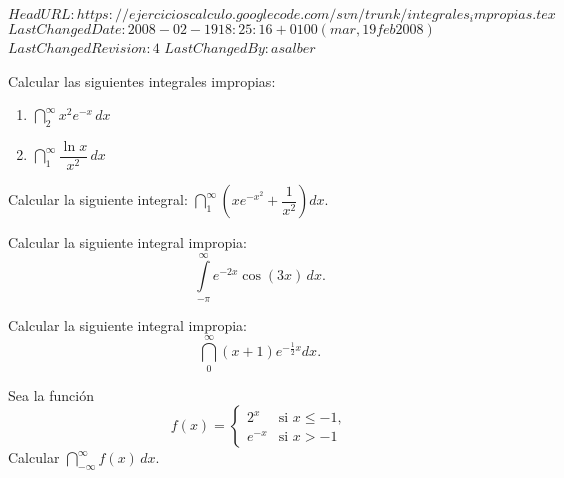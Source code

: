 \svnidlong
{$HeadURL: https://ejercicioscalculo.googlecode.com/svn/trunk/integrales_impropias.tex $}
{$LastChangedDate: 2008-02-19 18:25:16 +0100 (mar, 19 feb 2008) $}
{$LastChangedRevision: 4 $}
{$LastChangedBy: asalber $}
%
{Calcular las siguientes integrales impropias:
\begin{multicols}{2}
\begin{enumerate}
\item $\dint\limits_{2}^{\infty }x^{2}e^{-x}\,dx$
\item $\dint\limits_{1}^{\infty }\dfrac{\ln x}{x^{2}}\,dx$
\end{enumerate}
\end{multicols}
}


{Calcular la siguiente integral: $\dint\limits_{1}^{\infty }\left(xe^{-x^{2}}+\dfrac{1}{x^{2}}\right) dx.$
}


{Calcular la siguiente integral impropia:
\[
\int\limits_{ - \pi }^\infty  {e^{ - 2x} \cos (3x)\,dx}.
\]
}


{Calcular la siguiente integral impropia:
\[
\dint\limits_{0}^{\infty }(x+1)e^{-\tfrac{1}{2}x}dx.
\]
}


{Sea la función
\[
f(x) =
\begin{cases}
2^x & \mbox{si $x\leq -1$},\\
e^{-x} & \mbox{si $x > -1$}
\end{cases} 
\]
Calcular $\dint\limits_{-\infty }^\infty f(x)\,dx$.
}



